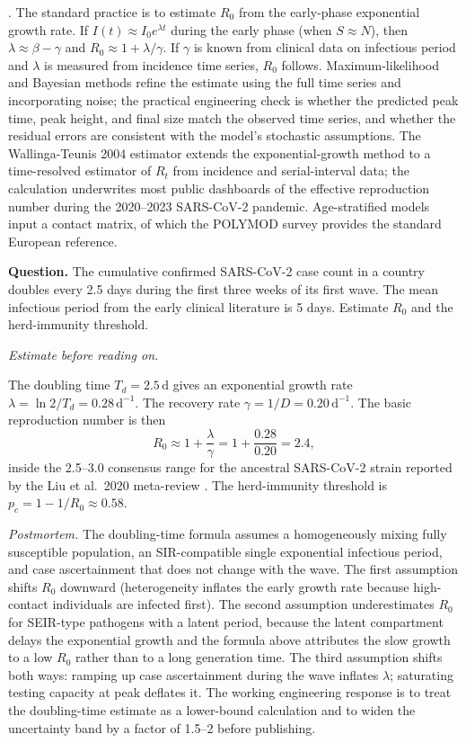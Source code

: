 . The standard practice is to
estimate $R_0$ from the early-phase exponential growth rate. If
$I(t) \approx I_0 e^{\lambda t}$ during the early phase (when
$S \approx N$), then $\lambda \approx \beta - \gamma$ and $R_0
\approx 1 + \lambda/\gamma$. If $\gamma$ is known from clinical
data on infectious period and $\lambda$ is measured from incidence
time series, $R_0$ follows. Maximum-likelihood and Bayesian
methods refine the estimate using the full time series and
incorporating noise; the practical engineering check is
whether the predicted peak time, peak height, and final size
match the observed time series, and whether the residual
errors are consistent with the model's stochastic assumptions.
The Wallinga-Teunis 2004 estimator
\cite[pp.~509--516]{paper:v6c08-wallinga-teunis-2004} extends the
exponential-growth method to a time-resolved estimator of $R_t$ from
incidence and serial-interval data; the calculation underwrites most
public dashboards of the effective reproduction number during the
2020--2023 SARS-CoV-2 pandemic. Age-stratified models input a
contact matrix, of which the POLYMOD survey
\cite[pp.~e74-1--e74-15]{paper:v6c08-mossong-polymod-2008} provides
the standard European reference.

\begin{estimation}
\textbf{Question.} The cumulative confirmed SARS-CoV-2 case count
in a country doubles every 2.5 days during the first three weeks of
its first wave. The mean infectious period from the early clinical
literature is 5 days. Estimate $R_0$ and the herd-immunity
threshold.

\smallskip
\textit{Estimate before reading on.}

\smallskip
The doubling time $T_d = 2.5\,\text{d}$ gives an exponential growth
rate $\lambda = \ln 2 / T_d = 0.28\,\text{d}^{-1}$. The recovery
rate $\gamma = 1/D = 0.20\,\text{d}^{-1}$. The basic reproduction
number is then
\[
R_0 \approx 1 + \frac{\lambda}{\gamma} = 1 + \frac{0.28}{0.20}
= 2.4,
\]
inside the 2.5--3.0 consensus range for the ancestral SARS-CoV-2
strain reported by the Liu et al.\ 2020 meta-review
\cite[Tab.~1]{paper:v6c08-liu-covid-r0-2020}. The herd-immunity
threshold is $p_c = 1 - 1/R_0 \approx 0.58$.

\smallskip
\textit{Postmortem.} The doubling-time formula assumes a
homogeneously mixing fully susceptible population, an SIR-compatible
single exponential infectious period, and case ascertainment that
does not change with the wave. The first assumption shifts $R_0$
downward (heterogeneity inflates the early growth rate because
high-contact individuals are infected first). The second assumption
underestimates $R_0$ for SEIR-type pathogens with a latent period,
because the latent compartment delays the exponential growth and
the formula above attributes the slow growth to a low $R_0$ rather
than to a long generation time. The third assumption shifts both
ways: ramping up case ascertainment during the wave inflates
$\lambda$; saturating testing capacity at peak deflates it. The
working engineering response is to treat the doubling-time estimate
as a lower-bound calculation and to widen the uncertainty band by
a factor of 1.5--2 before publishing.
\end{estimation}

